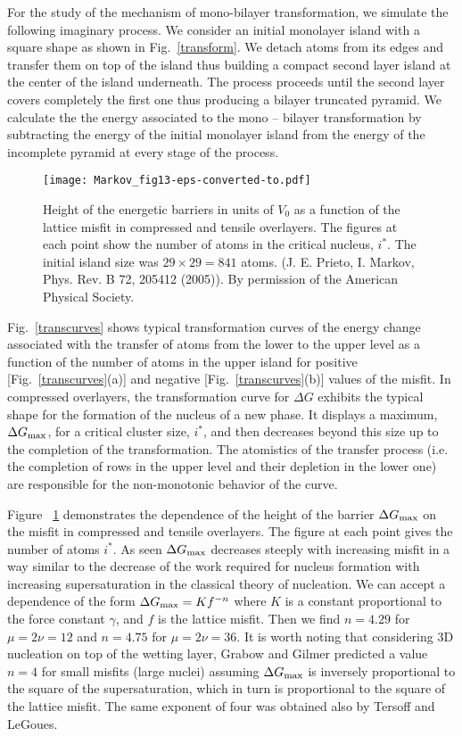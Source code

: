 \documentclass[aps,prl,showpacs,twocolumn,byrevtex,floatfix]{revtex4-1}
\begin{document}
For the study of the mechanism of mono-bilayer transformation, we simulate the
following imaginary process. We consider an initial monolayer island with a
square shape as shown in Fig.\ \ref{transform}. We detach atoms from its edges
and transfer them on top of the island thus building a compact second layer 
island at the center of the island underneath. The process proceeds 
until the second layer covers completely the first one thus producing a 
bilayer truncated pyramid. 
We calculate the the energy associated to the mono -- bilayer transformation 
by subtracting the energy of the initial monolayer island from the energy 
of the incomplete pyramid at every stage of the process.

\begin{figure}[htb]
\texttt{[image: Markov\_fig13-eps-converted-to.pdf]}
\caption{\label{deltage} Height of the energetic barriers in units of $V_0$ as a
function of the lattice misfit in compressed and tensile overlayers. The figures
at each point show the number of atoms in the critical nucleus, $i^*$. The
initial island size was $29 \times 29 = 841$ atoms. (J. E. Prieto, I. Markov,
Phys. Rev. B 72, 205412 (2005)). By permission of the American Physical
Society.}
\end{figure}


Fig.\ \ref{transcurves} shows typical transformation curves of the energy
change associated with the transfer of atoms from the lower to the upper level
as a function of the number of atoms in the upper island for positive [Fig.\
\ref{transcurves}(a)] and negative [Fig.\ \ref{transcurves}(b)] values of the
misfit. In compressed overlayers, the transformation curve for $\Delta G$
exhibits the typical shape for the formation of the nucleus of a new phase. It
displays a maximum, $\Delta G_{\rm max}$, for a critical cluster size, $i^*$,
and then decreases beyond this size up to the completion of the transformation.
The atomistics of the transfer process (i.e. the completion of rows in the upper
level and their depletion in the lower one) are responsible for the
non-monotonic behavior of the curve.

Figure \ \ref{deltage} demonstrates the dependence of the height of the barrier
$\Delta G_{\rm max}$ on the misfit in compressed and tensile overlayers. The
figure at each point gives the number of atoms $i^*$. As seen $\Delta G_{\rm
max}$ decreases steeply with increasing misfit in a way similar to the decrease
of the work required for nucleus formation with increasing supersaturation in
the classical theory of nucleation.\cite{Markov17,Kashchiev00,Markov10} We can
accept a dependence of the form $\Delta G_{\rm max} = K f^{-n}$ where $K$ is a
constant proportional to the force constant $\gamma$, and $f$ is the lattice
misfit. Then we find $n = 4.29$ for $\mu = 2\nu = 12$ and $n = 4.75$ for $\mu =
2\nu = 36$. It is worth noting that considering 3D nucleation on top
of the wetting layer, Grabow and Gilmer predicted a value $n = 4$ for small
misfits (large nuclei) assuming $\Delta G_{\rm max}$ is inversely proportional
to the square of the supersaturation, which in turn is proportional to the
square of the lattice misfit.\cite{Grabow88} The same exponent of four was
obtained also by Tersoff and LeGoues.\cite{Tersoff94}
\end{document}
